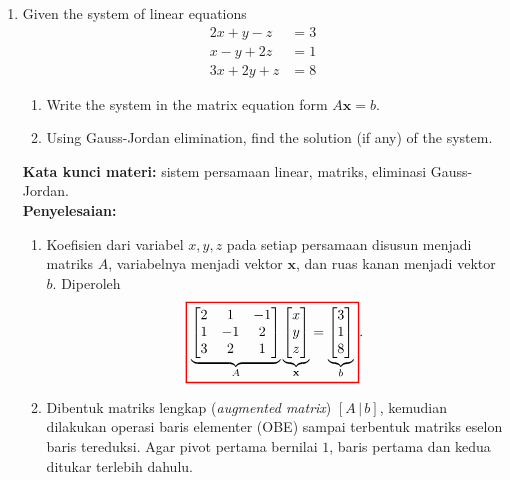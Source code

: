 \documentclass[10pt,openany,a4paper]{article}
\theoremstyle{definition}
\theoremstyle{definition}
\theoremstyle{plain}
\newenvironment{jawab}[2][tes]{%
\par\noindent\textbf{Kata kunci materi:} #1.\\
\textbf{Penyelesaian:} #2%
}{}
\begin{document}
\begin{enumerate}
    \item Given the system of linear equations
    \begin{align*}
        2x+y-z &= 3\\
        x-y+2z &= 1\\
        3x+2y+z &= 8
    \end{align*}
    \begin{enumerate}
        \item Write the system in the matrix equation form $A\mathbf{x}=b$.
        \item Using Gauss-Jordan elimination, find the solution (if any) of the system.
    \end{enumerate}
    \begin{jawab}[sistem persamaan linear, matriks, eliminasi Gauss-Jordan]{
        \begin{enumerate}
            \item Koefisien dari variabel $x,y,z$ pada setiap persamaan disusun menjadi matriks $A$, variabelnya menjadi vektor $\mathbf{x}$, dan ruas kanan menjadi vektor $b$. Diperoleh
            \begin{align*}
                \colorlet{oldcolor}{.}
        \color{red}
        \setlength{\fboxrule}{1pt} \boxed{\color{oldcolor}\underbrace{\begin{bmatrix}
                    2 & 1 & -1\\
                    1 & -1 & 2\\
                    3 & 2 & 1
                \end{bmatrix}}_{A}
                \underbrace{\begin{bmatrix}
                    x\\ y\\ z
                \end{bmatrix}}_{\mathbf{x}}
                =
                \underbrace{\begin{bmatrix}
                    3\\ 1\\ 8
                \end{bmatrix}}_{b}}\color{oldcolor}.
            \end{align*}
            \item Dibentuk matriks lengkap (\textit{augmented matrix}) $[A\,|\,b]$, kemudian dilakukan operasi baris elementer (OBE) sampai terbentuk matriks eselon baris tereduksi. Agar pivot pertama bernilai $1$, baris pertama dan kedua ditukar terlebih dahulu.
            \begin{align*}

\end{align*}
\end{enumerate}}
\end{jawab}
\end{enumerate}
\end{document}
